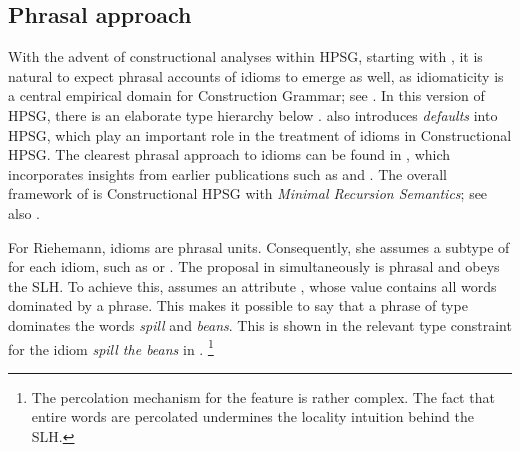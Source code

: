 \documentclass[output=paper,biblatex,babelshorthands,newtxmath,draftmode,colorlinks,citecolor=brown]{langscibook}
\begin{document}
\subsection{Phrasal approach}
\label{Sec-Phrasal}

\largerpage[1]
%
With the advent of constructional analyses within HPSG, starting with
\citet{Sag97a}, it is natural to expect phrasal accounts of idioms to emerge as well, as
idiomaticity is a central empirical domain for Construction Grammar\indexcxg; see
.  In this version of HPSG, there is an elaborate type hierarchy below
.  \citet{Sag97a} also introduces \emph{defaults} into HPSG, which play an
important role in the treatment of idioms in Constructional HPSG.  The clearest phrasal approach to
idioms can be found in \citet{Riehemann2001a}, which incorporates insights from earlier publications
such as \citet{Riehemann97a} and \citet{RB99a}.
%
The overall framework of \citet{Riehemann2001a} is Constructional HPSG with \emph{Minimal Recursion Semantics}\indexmrs  \citep{CFMRS95a-u,CFPS2005a}; see also .

\begin{sloppypar}
For Riehemann, idioms are phrasal units.  Consequently, she assumes a subtype of  for each idiom, such as  or .  The proposal in \citet{Riehemann2001a} simultaneously is phrasal and obeys the SLH. To achieve this, \citet{Riehemann2001a} assumes an attribute , whose value contains all words dominated by a phrase. This makes it possible to say that a phrase of type  dominates the words \emph{spill} and \emph{beans}. This is shown in the relevant type constraint for the idiom \emph{spill the beans} in .%
\footnote{The percolation mechanism for the feature  is rather complex. 
The fact that entire words are percolated undermines the locality intuition behind the SLH.
}
\end{sloppypar}
\end{document}
